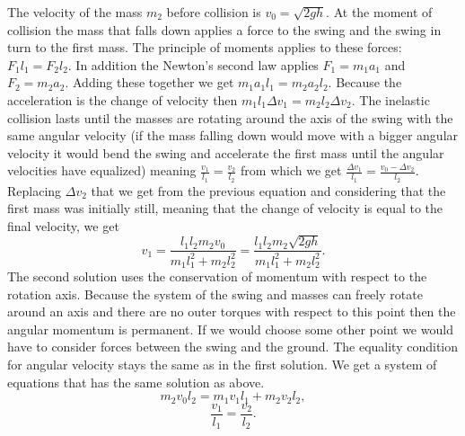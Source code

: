 \documentclass[11pt]{article}
\begin{document}
\solueng
The velocity of the mass $m_2$ before collision is $v_0=\sqrt{2gh}$. At the moment of collision the mass that falls down applies a force to the swing and the swing in turn to the first mass. The principle of moments applies to these forces:  $F_1l_1=F_2l_2$. In addition the Newton’s second law applies $F_1=m_1a_1$ and $F_2=m_2a_2$. Adding these together we get $m_1a_1l_1=m_2a_2l_2$. Because the acceleration is the change of velocity then $m_1l_1\Delta v_1=m_2l_2\Delta v_2$. The inelastic collision lasts until the masses are rotating around the axis of the swing with the same angular velocity (if the mass falling down would move with a bigger angular velocity it would bend the swing and accelerate the first mass until the angular velocities have equalized) meaning $\frac{v_1}{l_1}=\frac{v_2}{l_2}$ from which we get $\frac{\Delta v_1}{l_1}=\frac{v_0-\Delta v_2}{l_2}$. Replacing $\Delta v_2$ that we get from the previous equation and considering that the first mass was initially still, meaning that the change of velocity is equal to the final velocity, we get
\[
v_1=\frac{l_1l_2m_2v_0}{m_1l_1^2+m_2l_2^2}=\frac{l_1l_2m_2\sqrt{2gh}}{m_1l_1^2+m_2l_2^2}.
\] 
The second solution uses the conservation of momentum with respect to the rotation axis. Because the system of the swing and masses can freely rotate around an axis and there are no outer torques with respect to this point then the angular momentum is permanent. If we would choose some other point we would have to consider forces between the swing and the ground. The equality condition for angular velocity stays the same as in the first solution. We get a system of equations that has the same solution as above.
\[
 m_2v_0l_2=m_1v_1l_1+m_2v_2l_2,
\] 
\[
\frac{v_1}{l_1}=\frac{v_2}{l_2}.
\]
\probend
\bigskip

\end{document}
